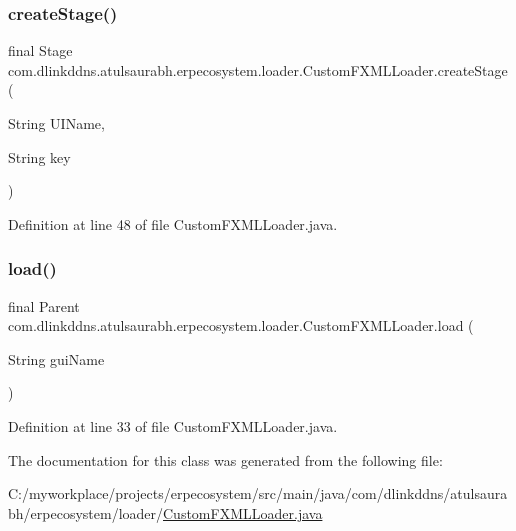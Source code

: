 \subsubsection{\texorpdfstring{create\+Stage()}{createStage()}}
{\footnotesize\ttfamily final Stage com.\+dlinkddns.\+atulsaurabh.\+erpecosystem.\+loader.\+Custom\+F\+X\+M\+L\+Loader.\+create\+Stage (\begin{DoxyParamCaption}\item[{String}]{U\+I\+Name,  }\item[{String}]{key }\end{DoxyParamCaption})}



Definition at line 48 of file Custom\+F\+X\+M\+L\+Loader.\+java.

\mbox{\label{classcom_1_1dlinkddns_1_1atulsaurabh_1_1erpecosystem_1_1loader_1_1_custom_f_x_m_l_loader_a7e3c0b074c43866c2950964b208b2bef}} 
\subsubsection{\texorpdfstring{load()}{load()}}
{\footnotesize\ttfamily final Parent com.\+dlinkddns.\+atulsaurabh.\+erpecosystem.\+loader.\+Custom\+F\+X\+M\+L\+Loader.\+load (\begin{DoxyParamCaption}\item[{String}]{gui\+Name }\end{DoxyParamCaption})}



Definition at line 33 of file Custom\+F\+X\+M\+L\+Loader.\+java.



The documentation for this class was generated from the following file\+:\begin{DoxyCompactItemize}
\item 
C\+:/myworkplace/projects/erpecosystem/src/main/java/com/dlinkddns/atulsaurabh/erpecosystem/loader/\mbox{\hyperlink{_custom_f_x_m_l_loader_8java}{Custom\+F\+X\+M\+L\+Loader.\+java}}\end{DoxyCompactItemize}
